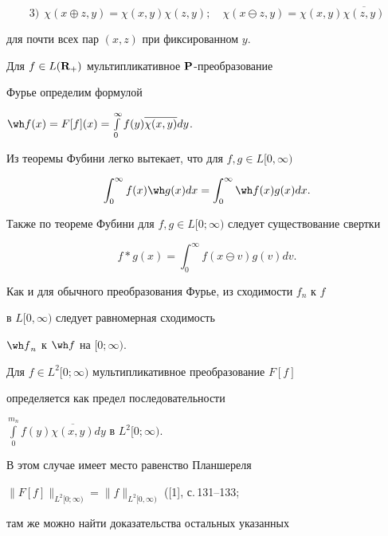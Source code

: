\begin{equation}


3)\ \ \chi(x\oplus z,y)=\chi(x,y)\chi(z,y);


\quad \chi(x\ominus z,y)=\chi(x,y)\overline{\chi(z,y)}


\end{equation}


для почти всех пар $(x,z)$ при фиксированном $y$.





Для $f\in L({\bold R}_+)$ мультипликативное $\bold P$-преобразование 


Фурье определим формулой


${\wh f}(x)=F[f](x)=\int\limits^{\infty}_0f(y)\overline{\chi(x,y)}dy$.


Из теоремы Фубини легко вытекает, что для $f,g\in L[0,\infty)$


\begin{equation*}


\int^{\infty}_0f(x){\wh g}(x)dx=\int^{\infty}_0{\wh f}(x)g(x)dx.


\end{equation*}


Также по теореме Фубини для $f,g\in L[0;\infty)$ следует существование свертки


\begin{equation*}


f*g(x)=\int^{\infty}_0f(x\ominus v)g(v)dv.


\end{equation*}


Как и для обычного преобразования Фурье, из сходимости $f_n$ к $f$ 


в $L[0,\infty)$ следует равномерная сходимость


${\wh f}_n$ к $\wh f$ на $[0;\infty)$.





Для $f\in L^2[0;\infty)$ мультипликативное преобразование $F[f]$ 


определяется как предел последовательности 


$\int\limits_0^{m_n}f(y)\overline {\chi(x,y)}dy$ в $L^2[0;\infty)$.


В этом случае имеет место равенство Планшереля


$\|F[f]\|_{L^2[0;\infty)}=\|f\|_{L^2[0,\infty)}$ ([1], с.\,131--133;


там же можно найти доказательства остальных указанных 


